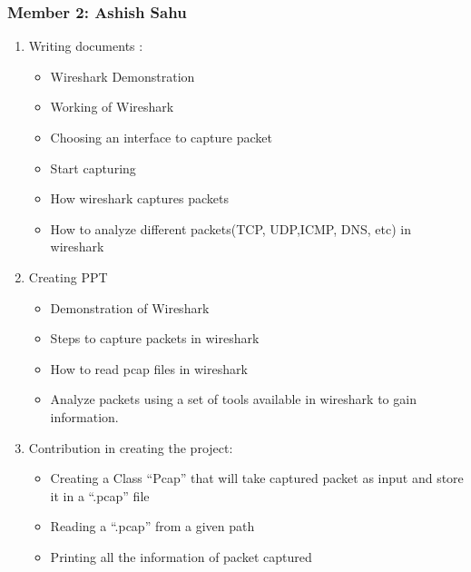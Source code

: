 \documentclass[12pt, a4paper]{report}
\begin{document}
\subsubsection{Member 2: Ashish Sahu}
\begin{enumerate}
    \item Writing documents :
        \begin{itemize}
        \item   Wireshark Demonstration
    	\item Working of Wireshark
    	\item Choosing an interface to capture packet
    	\item Start capturing 
        \item How wireshark captures packets
        \item How to analyze different packets(TCP, UDP,ICMP, DNS, etc) in wireshark 

    \end{itemize}
    
    \item Creating PPT
        \begin{itemize}
            \item Demonstration of Wireshark
        	\item Steps to capture packets in wireshark
        	\item How to read pcap files in wireshark
        	\item Analyze packets using a set of tools available in wireshark to gain information.

        \end{itemize}
    
    \item Contribution in creating the project:

        \begin{itemize}
            \item Creating a Class “Pcap” that will take captured packet as input and store it in a “.pcap” file
            \item Reading a “.pcap” from a given path
            \item Printing all the information of packet captured

        \end{itemize}
\end{enumerate}
\end{document}
